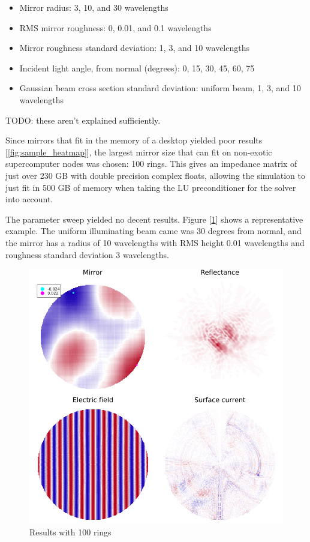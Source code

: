 \documentclass[etd,twoside,senior]{BYUPhys}
\begin{document}
\begin{itemize}
  \item Mirror radius: 3, 10, and 30 wavelengths
  \item RMS mirror roughness: 0, 0.01, and 0.1 wavelengths
  \item Mirror roughness standard deviation: 1, 3, and 10 wavelengths
  \item Incident light angle, from normal (degrees): 0, 15, 30, 45, 60, 75
  \item Gaussian beam cross section standard deviation: uniform beam, 1, 3, and 10 wavelengths
\end{itemize}

TODO: these aren't explained sufficiently.

Since mirrors that fit in the memory of a desktop yielded poor results [\ref{fig:sample_heatmap}], the largest mirror size that can fit on non-exotic supercomputer nodes was chosen: 100 rings. This gives an impedance matrix of just over 230 GB with double precision complex floats, allowing the simulation to just fit in 500 GB of memory when taking the LU preconditioner for the solver into account.

The parameter sweep yielded no decent results. Figure [\ref{fig:100_rings}] shows a representative example. The uniform illuminating beam came was 30 degrees from normal, and the mirror has a radius of 10 wavelengths with RMS height 0.01 wavelengths and roughness standard deviation 3 wavelengths.

\begin{figure}
  \centerline{\includegraphics[width=\textwidth]{100-ring-results}}
  \caption[Results with 100 rings]{\label{fig:100_rings}
    Results with 100 rings}
\end{figure}
\end{document}
